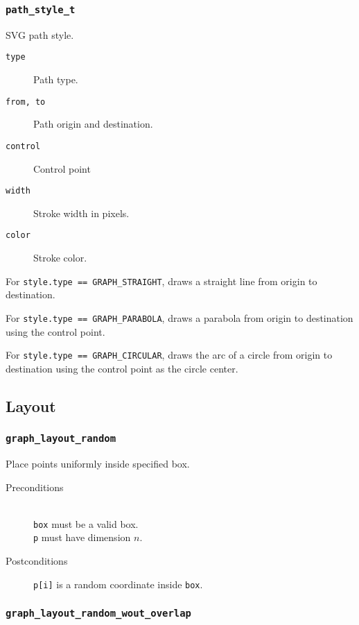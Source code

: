 \subsubsection{\texttt{path\_style\_t}}

SVG path style.

\begin{description}
 \item[\texttt{type}] Path type.
 \item[\texttt{from, to}] Path origin and destination.
 \item[\texttt{control}] Control point
 \item[\texttt{width}] Stroke width in pixels.
 \item[\texttt{color}] Stroke color.
\end{description}

 For \texttt{style.type == GRAPH\_STRAIGHT}, draws a straight line from origin
 to destination.
 
 For \texttt{style.type == GRAPH\_PARABOLA}, draws a parabola from origin
 to destination using the control point.
 
 For \texttt{style.type == GRAPH\_CIRCULAR}, draws the arc of a circle from 
 origin to destination using the control point as the circle center.

\subsection{Layout}

\subsubsection{\texttt{graph\_layout\_random}}

Place points uniformly inside specified box.

\begin{description}
 \item[Preconditions]~\\
   \texttt{box} must be a valid box.\\
   \texttt{p} must have dimension $n$.
 \item[Postconditions] \texttt{p[i]} is a random coordinate inside \texttt{box}.
\end{description}

\subsubsection{\texttt{graph\_layout\_random\_wout\_overlap}}

